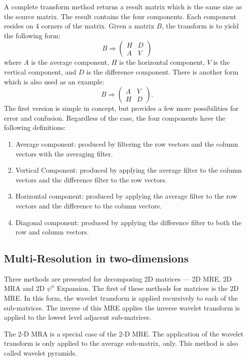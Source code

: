 A complete transform method returns a result matrix which is the same
size as the source matrix. The result contains the four
components. Each component resides on 4 corners of the matrix. Given a
matrix $B$, the transform is to yield the following form:
\[ 
B \Rightarrow 
\left(
\begin{array}{cc}
H & D \\ 
A & V
\end{array}
\right)
\]
where $A$ is the average component, $H$ is the horizontal component,
$V$ is the vertical component, and $D$ is the difference
component. There is another form which is also used as an example:
\[
B \Rightarrow 
\left(
\begin{array}{cc}
A & V \\ 
H & D
\end{array}
\right)
.\]
The first version is simple in concept, but provides a few more
possibilities for error and confusion.  Regardless of the case, the
four components have the following definitions:
\begin{enumerate}
\item Average component: produced by filtering the row vectors and the column vectors with the averaging filter.
\item Vertical Component:  produced by applying the average filter to the column vectors and the difference filter to the row vectors.
\item Horizontal component: produced by applying the average filter to the row vectors and the difference to the column vectors.
\item Diagonal component: produced by applying the difference filter to both the row and column vectors.  
\end{enumerate}

\subsection {Multi-Resolution in two-dimensions} 

Three methods are presented for decomposing 2D matrices --- 2D MRE, 2D
MRA and 2D $\psi^n$ Expansion. The first of these methods for matrices
is the 2D MRE.  In this form, the wavelet transform is applied
recursively to each of the sub-matrices.  The inverse of this MRE
applies the inverse wavelet transform is applied to the lowest level
adjacent sub-matrices.

The 2-D MRA is a special case of the 2-D MRE.  The application of the
wavelet transform is only applied to the average sub-matrix, only.
This method is also called wavelet pyramids.

